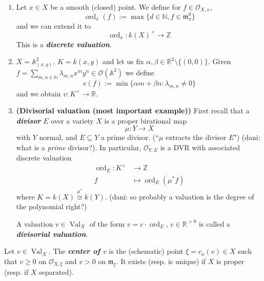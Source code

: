 \begin{example}\leavevmode
\begin{enumerate}
\item Let \(x \in X\) be a smooth (closed) point. We define for \(f \in \mathcal{O}_{X,x}\),
	\[\operatorname{ord}_x(f):= \operatorname{max}\{ d \in \mathbb{N}, f \in \mathfrak{m}^d_x\}\]
	and we can extend it to 
	\[\operatorname{ord}_x:k(X)^\times \longrightarrow \mathbb{Z}\]
	This is a \textit{\textbf{discrete valuation}}.
	
\item \(X=\mathbb{A}^2_{(x,y)}\), \(K=k(x,y)\) and let us fix  \(\alpha,\beta \in \mathbb{R}^2\setminus \{(0,0)\}\). Given \(f = \sum_{m,n \in \mathbb{N}}\lambda_{m,n}x^my^n \in \mathcal{O}(\mathbb{A}^2)\) we define
	\[v(f):=\operatorname{min}\{ \alpha m + \beta n: \lambda_{m,n}\neq  0\}\]and we obtain \(v:K^\times \to \mathbb{R}\).
	
\item \textbf{(Divisorial valuation (most important example))} First recall that a \textit{\textbf{divisor}} \(E\) over a variety  \(X\) is a proper birational map
	\[\mu:Y \longrightarrow X\]
	with \(Y\) normal, and \(E \subseteq Y\) a prime divisor. (``\(\mu\) extracts the divisor \(E\)") {\color{6}(dani: what is a \textit{prime} divisor?)}. In particular, \(\mathcal{O}_{Y,E}\) is a DVR with associated discrete valuation
	\begin{align*}
		\operatorname{ord}_E: K^\times &\longrightarrow \mathbb{Z} \\
		f &\longmapsto \operatorname{ord}_E(\mu^*f)
	\end{align*}
	where \(K=k(X) \overset{\mu^*}{\cong}k(Y)\). {\color{7}(dani: so probably a valuation is the degree of the polynomial right?)}

	A valuation \(v \in \operatorname{Val}_X\) of the form \(v = c \cdot \operatorname{ord}_E\), \(c \in \mathbb{R}^{>0}\) is called a \textit{\textbf{divisorial valuation}}.
	
\end{enumerate}
\end{example}

\begin{defn}\leavevmode
Let \(v \in \operatorname{Val}_X\). The \textit{\textbf{center of \(v\)}} is the (schematic) point \(\xi=c_x(v) \in X\) such that \(v \geq 0\) on \(\mathcal{O}_{X,\xi}\) and \(v>0\) on  \(\mathfrak{m}_\xi\). It exists (resp. is unique) if \(X\) is proper (resp. if \(X\) separated).
\end{defn}

